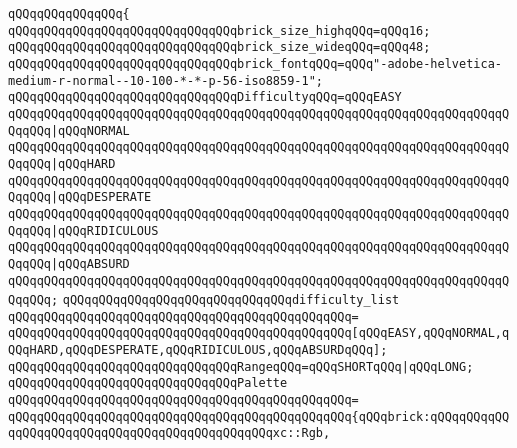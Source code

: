 \verb|qQQqqQQqqQQqqQQq{|\newline
\verb|qQQqqQQqqQQqqQQqqQQqqQQqqQQqqQQqbrick_size_highqQQq=qQQq16;|\newline
\verb|qQQqqQQqqQQqqQQqqQQqqQQqqQQqqQQqbrick_size_wideqQQq=qQQq48;|\newline
\newline
\verb|qQQqqQQqqQQqqQQqqQQqqQQqqQQqqQQqbrick_fontqQQq=qQQq"-adobe-helvetica-medium-r-normal--10-100-*-*-p-56-iso8859-1";|\newline
\newline
\verb|qQQqqQQqqQQqqQQqqQQqqQQqqQQqqQQqDifficultyqQQq=qQQqEASY|\newline
\verb|qQQqqQQqqQQqqQQqqQQqqQQqqQQqqQQqqQQqqQQqqQQqqQQqqQQqqQQqqQQqqQQqqQQqqQQqqQQq|\verb#|qQQqNORMAL#\newline
\verb|qQQqqQQqqQQqqQQqqQQqqQQqqQQqqQQqqQQqqQQqqQQqqQQqqQQqqQQqqQQqqQQqqQQqqQQqqQQq|\verb#|qQQqHARD#\newline
\verb|qQQqqQQqqQQqqQQqqQQqqQQqqQQqqQQqqQQqqQQqqQQqqQQqqQQqqQQqqQQqqQQqqQQqqQQqqQQq|\verb#|qQQqDESPERATE#\newline
\verb|qQQqqQQqqQQqqQQqqQQqqQQqqQQqqQQqqQQqqQQqqQQqqQQqqQQqqQQqqQQqqQQqqQQqqQQqqQQq|\verb#|qQQqRIDICULOUS#\newline
\verb|qQQqqQQqqQQqqQQqqQQqqQQqqQQqqQQqqQQqqQQqqQQqqQQqqQQqqQQqqQQqqQQqqQQqqQQqqQQq|\verb#|qQQqABSURD#\newline
\verb|qQQqqQQqqQQqqQQqqQQqqQQqqQQqqQQqqQQqqQQqqQQqqQQqqQQqqQQqqQQqqQQqqQQqqQQqqQQq;|\newline
\newline
\verb|qQQqqQQqqQQqqQQqqQQqqQQqqQQqqQQqdifficulty_list|\newline
\verb|qQQqqQQqqQQqqQQqqQQqqQQqqQQqqQQqqQQqqQQqqQQqqQQq=|\newline
\verb|qQQqqQQqqQQqqQQqqQQqqQQqqQQqqQQqqQQqqQQqqQQqqQQq[qQQqEASY,qQQqNORMAL,qQQqHARD,qQQqDESPERATE,qQQqRIDICULOUS,qQQqABSURDqQQq];|\newline
\newline
\verb|qQQqqQQqqQQqqQQqqQQqqQQqqQQqqQQqRangeqQQq=qQQqSHORTqQQq|\verb#|qQQqLONG;#\newline
\newline
\verb|qQQqqQQqqQQqqQQqqQQqqQQqqQQqqQQqPalette|\newline
\verb|qQQqqQQqqQQqqQQqqQQqqQQqqQQqqQQqqQQqqQQqqQQqqQQq=|\newline
\verb|qQQqqQQqqQQqqQQqqQQqqQQqqQQqqQQqqQQqqQQqqQQqqQQq{qQQqbrick:qQQqqQQqqQQqqQQqqQQqqQQqqQQqqQQqqQQqqQQqqQQqqQQqxc::Rgb,|\newline
